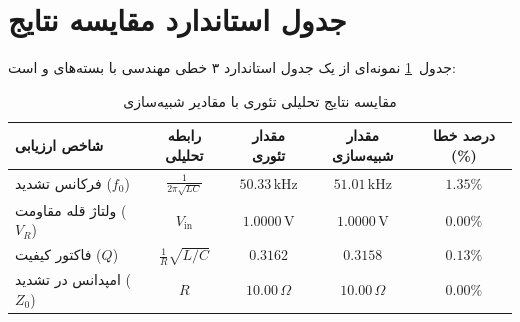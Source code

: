 \documentclass[12pt,a4paper]{article}
\begin{document}
\vspace{0.4cm}

\section{جدول استاندارد مقایسه نتایج}
جدول~\ref{tab:comparison} نمونه‌ای از یک جدول استاندارد ۳ خطی مهندسی با بسته‌های  و  است:

\begin{table}[H]
    \centering
    \caption{مقایسه نتایج تحلیلی تئوری با مقادیر شبیه‌سازی}
    \label{tab:comparison}
    \begin{tabular}{lcccc}
        \toprule
        \textbf{شاخص ارزیابی} & \textbf{رابطه تحلیلی} & \textbf{مقدار تئوری} & \textbf{مقدار شبیه‌سازی} & \textbf{درصد خطا (\%)} \\
        \midrule
        فرکانس تشدید ($f_0$) & $\frac{1}{2\pi\sqrt{LC}}$ & $50.33\,\mathrm{kHz}$ & $51.01\,\mathrm{kHz}$ & $1.35\%$ \\
        ولتاژ قله مقاومت ($V_{R}$) & $V_{\mathrm{in}}$ & $1.0000\,\mathrm{V}$ & $1.0000\,\mathrm{V}$ & $0.00\%$ \\
        فاکتور کیفیت ($Q$) & $\frac{1}{R}\sqrt{L/C}$ & $0.3162$ & $0.3158$ & $0.13\%$ \\
        امپدانس در تشدید ($Z_0$) & $R$ & $10.00\,\Omega$ & $10.00\,\Omega$ & $0.00\%$ \\
        \bottomrule
    \end{tabular}
\end{table}

\vspace{0.6cm}

\begin{latin}


\end{latin}
\end{document}
